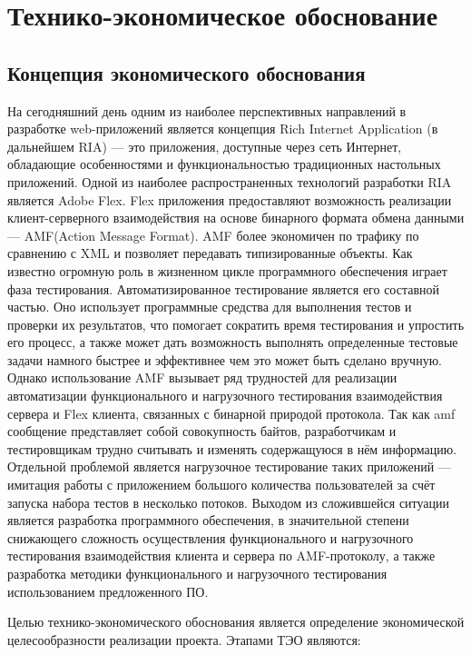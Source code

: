 \chapter{Технико-экономическое обоснование}

\section{Концепция экономического обоснования}

На сегодняшний день одним из наиболее перспективных направлений в разработке
web-приложений является концепция Rich Internet Application (в дальнейшем RIA) --- это приложения,
доступные через сеть Интернет, обладающие особенностями и функциональностью традиционных настольных приложений.
Одной из наиболее распространенных технологий разработки RIA является Adobe Flex.
Flex приложения предоставляют возможность реализации клиент-серверного взаимодействия на основе бинарного формата
обмена данными --- AMF(Action Message Format). AMF более экономичен по трафику по сравнению с XML и позволяет
передавать типизированные объекты.
Как известно огромную роль в жизненном цикле программного обеспечения играет фаза тестирования.
Автоматизированное тестирование является его составной частью. Оно использует программные средства для
выполнения тестов и проверки их результатов, что помогает сократить время тестирования и упростить его процесс,
а также может дать возможность выполнять определенные тестовые задачи намного быстрее и эффективнее чем это может
быть сделано вручную. Однако использование AMF вызывает ряд трудностей для реализации автоматизации
функционального и нагрузочного тестирования взаимодействия сервера и Flex клиента, связанных с
бинарной природой протокола. Так как amf сообщение представляет собой совокупность байтов, разработчикам
и тестировщикам трудно считывать и изменять содержащуюся в нём информацию. Отдельной проблемой является
нагрузочное тестирование таких приложений --- имитация работы с приложением большого количества пользователей
за счёт запуска набора тестов в несколько потоков. Выходом из сложившейся ситуации является разработка
программного обеспечения, в значительной степени снижающего сложность осуществления функционального и
нагрузочного тестирования взаимодействия клиента и сервера по AMF-протоколу, а также разработка
методики функционального и нагрузочного тестирования использованием предложенного ПО.

Целью технико-экономического обоснования является определение экономической целесообразности реализации проекта.
Этапами ТЭО являются:

